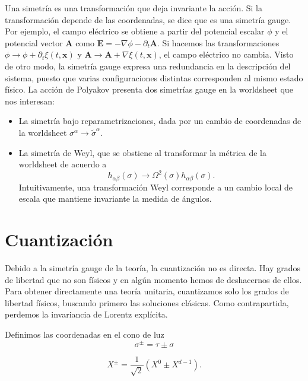 Una simetría es una transformación que deja invariante la acción. 
Si la transformación depende de las coordenadas, se dice que es una simetría gauge. 
Por ejemplo, el campo eléctrico se obtiene a partir del potencial escalar $\phi$ y
el potencial vector $\mathbf A$ como $\mathbf E = -\nabla \phi - \partial_t \mathbf A$.
Si hacemos las transformaciones $\phi \to \phi + \partial_t \xi(t,\mathbf x)$ y 
$\mathbf A \to \mathbf A + \nabla \xi(t,\mathbf x)$, el campo eléctrico no cambia.
Visto de otro modo, la simetría gauge expresa una redundancia en la descripción del sistema,  
puesto que varias configuraciones distintas corresponden al mismo estado físico.
La acción de Polyakov presenta dos simetrías gauge en la worldsheet que nos interesan:
\begin{itemize}
  \item La simetría bajo reparametrizaciones, dada por un cambio de coordenadas de la worldsheet $\sigma^\alpha \to \tilde \sigma^\alpha$. 
  \item La simetría de Weyl, que se obstiene al transformar la métrica de la worldsheet de acuerdo 
    a
    \begin{equation}
      h_{\alpha\beta}(\sigma) \to \Omega^2(\sigma) h_{\alpha\beta}(\sigma).
    \end{equation}
    Intuitivamente, una transformación Weyl corresponde a un cambio local de escala que mantiene
    invariante la medida de ángulos.
\end{itemize}



\section{Cuantización}

Debido a la simetría gauge de la teoría, la cuantización no es directa.
Hay grados de libertad que no son físicos y en algún momento hemos de deshacernos de ellos.
Para obtener directamente una teoría unitaria, cuantizamos solo los grados de libertad 
físicos, buscando primero las soluciones clásicas. 
Como contrapartida, perdemos la invariancia de Lorentz explícita.

Definimos las coordenadas en el cono de luz
\begin{equation}
  \sigma^\pm=\tau\pm\sigma
\end{equation}

\begin{equation}
  X^\pm=\frac{1}{\sqrt 2} (X^0 \pm X^{d-1}).
\end{equation}

